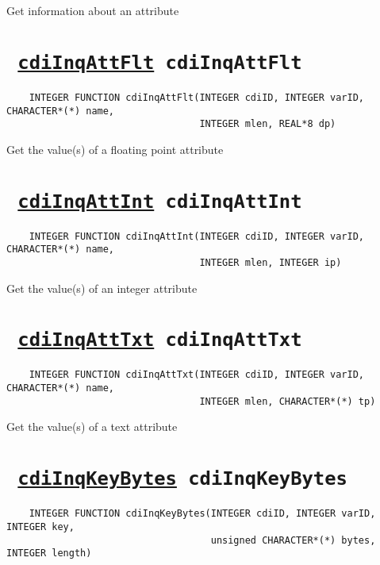 Get information about an attribute
\ifpdfoutput{}{(\ref{cdiInqAtt})}


\section*{\texttt{ 
\ifpdf
\hyperref[cdiInqAttFlt]{cdiInqAttFlt}
\else
cdiInqAttFlt
\fi
}}
\begin{verbatim}
    INTEGER FUNCTION cdiInqAttFlt(INTEGER cdiID, INTEGER varID, CHARACTER*(*) name, 
                                  INTEGER mlen, REAL*8 dp)
\end{verbatim}

Get the value(s) of a floating point attribute
\ifpdfoutput{}{(\ref{cdiInqAttFlt})}


\section*{\texttt{ 
\ifpdf
\hyperref[cdiInqAttInt]{cdiInqAttInt}
\else
cdiInqAttInt
\fi
}}
\begin{verbatim}
    INTEGER FUNCTION cdiInqAttInt(INTEGER cdiID, INTEGER varID, CHARACTER*(*) name, 
                                  INTEGER mlen, INTEGER ip)
\end{verbatim}

Get the value(s) of an integer attribute
\ifpdfoutput{}{(\ref{cdiInqAttInt})}


\section*{\texttt{ 
\ifpdf
\hyperref[cdiInqAttTxt]{cdiInqAttTxt}
\else
cdiInqAttTxt
\fi
}}
\begin{verbatim}
    INTEGER FUNCTION cdiInqAttTxt(INTEGER cdiID, INTEGER varID, CHARACTER*(*) name, 
                                  INTEGER mlen, CHARACTER*(*) tp)
\end{verbatim}

Get the value(s) of a text attribute
\ifpdfoutput{}{(\ref{cdiInqAttTxt})}


\section*{\texttt{ 
\ifpdf
\hyperref[cdiInqKeyBytes]{cdiInqKeyBytes}
\else
cdiInqKeyBytes
\fi
}}
\begin{verbatim}
    INTEGER FUNCTION cdiInqKeyBytes(INTEGER cdiID, INTEGER varID, INTEGER key, 
                                    unsigned CHARACTER*(*) bytes, INTEGER length)
\end{verbatim}

